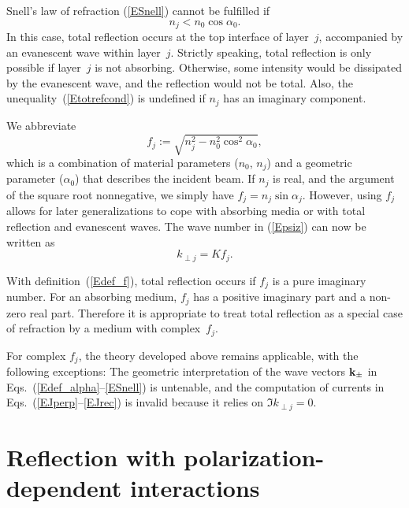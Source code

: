 Snell's law of refraction (\ref{ESnell})
cannot be fulfilled if
\begin{equation}\label{Etotrefcond}
  n_j<n_0\cos\alpha_0.  
\end{equation}
In this case, total reflection occurs at the top interface of layer~$j$,
accompanied by an evanescent wave within layer~$j$.
Strictly speaking,
total reflection is only possible if layer~$j$ is not absorbing.
Otherwise, some intensity would be dissipated by the evanescent wave,
and the reflection would not be total.
Also, the unequality~(\ref{Etotrefcond}) is undefined
if $n_j$ has an imaginary component.

We abbreviate
\begin{equation}\label{Edef_f}
f_j := \sqrt{ n_j^2 - n_0^2 \cos^2\alpha_0 },
\end{equation}
which is a combination of material parameters ($n_0$, $n_j$)
and a geometric parameter ($\alpha_0$) that describes the incident beam.
If $n_j$ is real, and the argument of the square root nonnegative,
we simply have $f_j=n_j\sin\alpha_j$.
However, using $f_j$ allows for later generalizations
to cope with absorbing media or with total reflection and evanescent waves.
The wave number in (\ref{Epsiz}) can now be written as
\begin{equation}\label{EkKf}
  k_{\perp j} = K f_j.
\end{equation}

With definition~(\ref{Edef_f}),
total reflection occurs if $f_j$ is a pure imaginary number.
For an absorbing medium, $f_j$ has a positive imaginary part
and a non-zero real part.
Therefore it is appropriate to treat total reflection as a special
case of refraction by a medium with complex~$f_j$.

For complex $f_j$,
the theory developed above
remains applicable, with the following exceptions:
The geometric interpretation of the wave vectors $\mathbf{k}_\pm$
in Eqs.~(\ref{Edef_alpha}--\ref{ESnell}) is untenable,
and the computation of currents in
Eqs.~(\ref{EJperp}--\ref{EJrec}) is invalid because it
relies on $\Im k_{\perp j}=0$.




\section{Reflection with polarization-dependent interactions}\label{s:pol}

